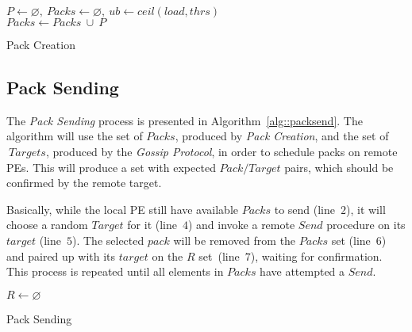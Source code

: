 \begin{algorithm}[!ht]
    \DontPrintSemicolon
    $P \gets \varnothing,\ Packs \gets \varnothing,\ ub \gets ceil(load,thrs)$ \\
    $Packs \gets Packs\ \cup\ P$   
    \caption{Pack Creation} 
    \label{alg::packcreation}
\end{algorithm}

\subsection{Pack Sending}

The \textit{Pack Sending} process is presented in Algorithm~\ref{alg::packsend}.
The algorithm will use the set of $Packs$, produced by \textit{Pack Creation}, and the set of $\ Targets$, produced by the \textit{Gossip Protocol}, in order to schedule packs on remote PEs.
This will produce a set with expected $Pack/Target$ pairs, which should be confirmed by the remote target.

Basically, while the local PE still have available $Packs$ to send (line~$2$), it will choose a random $Target$ for it (line~$4$) and invoke a remote $Send$ procedure on its $target$ (line~$5$).
The selected $pack$ will be removed from the $Packs$ set (line~$6$) and paired up with its $target$ on the $R$ set~(line~$7$), waiting for confirmation.
This process is repeated until all elements in $Packs$ have attempted a $Send$.

\begin{algorithm}[!ht]
    \DontPrintSemicolon
    $R \gets \varnothing$ \\
    \caption{Pack Sending}  
    \label{alg::packsend}
\end{algorithm}

